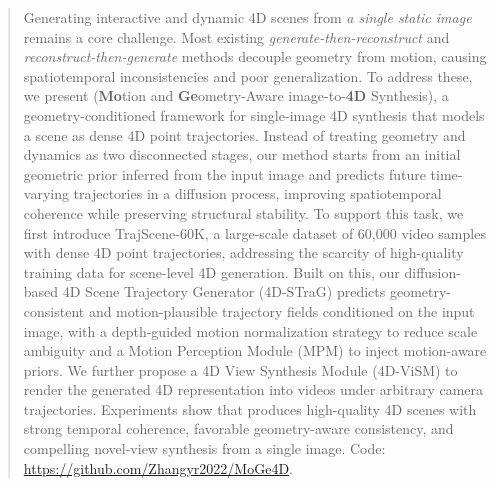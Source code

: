 

\begin{abstract}
Generating interactive and dynamic 4D scenes from \textit{a single static image} remains a core challenge. Most existing \textit{generate-then-reconstruct} and \textit{reconstruct-then-generate} methods decouple geometry from motion, causing spatiotemporal inconsistencies and poor generalization. To address these, 
we present \textbf{\ours} (\textbf{Mo}tion and \textbf{Ge}ometry-Aware image-to-\textbf{4D} Synthesis), a geometry-conditioned framework for single-image 4D synthesis that models a scene as dense 4D point trajectories. Instead of treating geometry and dynamics as two disconnected stages, our method starts from an initial geometric prior inferred from the input image and predicts future time-varying trajectories in a diffusion process, improving spatiotemporal coherence while preserving structural stability.
To support this task, we first introduce TrajScene-60K, a large-scale dataset of 60,000 video samples with dense 4D point trajectories, addressing the scarcity of high-quality training data for scene-level 4D generation. Built on this, our diffusion-based 4D Scene Trajectory Generator (4D-STraG) predicts geometry-consistent and motion-plausible trajectory fields conditioned on the input image, with a depth-guided motion normalization strategy to reduce scale ambiguity and a Motion Perception Module (MPM) to inject motion-aware priors.
We further propose a 4D View Synthesis Module (4D-ViSM) to render the generated 4D representation into videos under arbitrary camera trajectories. Experiments show that \ours produces high-quality 4D scenes with strong temporal coherence, favorable geometry-aware consistency, and compelling novel-view synthesis from a single image. Code: \url{https://github.com/Zhangyr2022/MoGe4D}.


\end{abstract}


